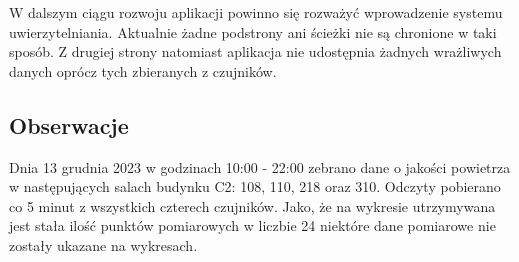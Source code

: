 W dalszym ciągu rozwoju aplikacji powinno się rozważyć wprowadzenie systemu uwierzytelniania. Aktualnie żadne podstrony ani ścieżki nie są chronione w taki sposób.
Z drugiej strony natomiast aplikacja nie udostępnia żadnych wrażliwych danych oprócz tych zbieranych z czujników.

\subsection{Obserwacje}

Dnia 13 grudnia 2023 w godzinach 10:00 - 22:00 zebrano dane o jakości powietrza w następujących salach budynku C2: 108, 110, 218 oraz 310. Odczyty pobierano
co 5 minut z wszystkich czterech czujników. Jako, że na wykresie utrzymywana jest stała ilość punktów pomiarowych w liczbie 24 niektóre dane pomiarowe 
nie zostały ukazane na wykresach.

